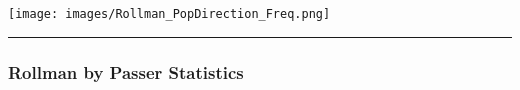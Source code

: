 \documentclass[a4paper,12pt]{article}
\begin{document}
\begin{table}[H]
{\begin{minipage}[t]{0.6\textwidth}
{\begin{tabular}
                
            
                
            
                
            
                
            
                
            
                
            
                
            
                
            
                
            
                
            


            \bottomrule
        \end{tabular}
        } %
    \end{minipage}
    } %
    \hfill
    \begin{minipage}[c]{0.35\textwidth} %
        \flushright
        \texttt{[image: images/Rollman\_PopDirection\_Freq.png]} %
    \end{minipage}
    
\end{table}

\vspace{-1em} %
\hrule height 1pt width 1\textwidth %
\vspace{1em} %

\subsubsection{Rollman by Passer Statistics}

\vspace{-1em} %
\end{document}
